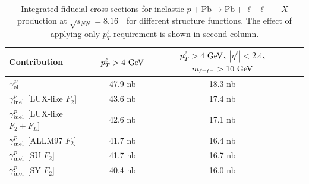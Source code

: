 \begin{table}[t]
\centering
\begin{tabular}{|l|c|c|c|}
\hline
Contribution  &  $p_{T}^{\ell}>4~\text{Ge\kern -0.1em V}$ & $p_{T}^{\ell}>4~\text{Ge\kern -0.1em V}$, $|\eta^{\ell}|<2.4 $, $m_{\ell^+\ell^-}>10~\text{Ge\kern -0.1em V}$ \\
\hline
$\gamma^{p}_{\rm{el}}$   & 47.9 nb  & 18.3 nb \\
\hline
$\gamma^{p}_{\rm{inel}}$ [LUX-like  $F_2$]  & 43.6 nb  &  17.4 nb\\
\hline
$\gamma^{p}_{\rm{inel}}$ [LUX-like  $F_2+F_L$]  & 42.6 nb    & 17.1 nb\\
\hline    
$\gamma^{p}_{\rm{inel}}$ [ALLM97 $F_2$]  & 41.7 nb   &16.4 nb\\
\hline
$\gamma^{p}_{\rm{inel}}$ [SU $F_2$]  & 41.7  nb &16.7 nb\\
\hline 
$\gamma^{p}_{\rm{inel}}$ [SY $F_2$]  & 40.4  nb  &16.0 nb\\
\hline
\end{tabular}
\caption{Integrated fiducial cross sections for inelastic $p+\textrm{Pb}\rightarrow \textrm{Pb} + \ell^+\ell^- + X$ production at $\sqrt{s_{N N}} = 8.16$~\TeV\ for different structure functions. 
The effect of applying only $p_T^{\ell}$ requirement is shown in second column.
}
\label{tab:kt}
\end{table}



